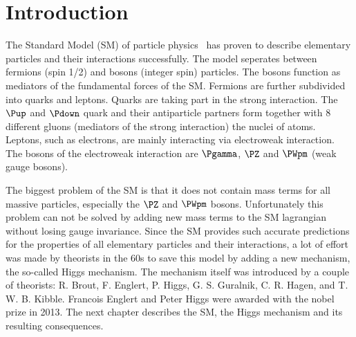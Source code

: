 \cleardoublepage
{}
{}
\let\oldchaptermarkformat=\chaptermarkformat
\renewcommand{\chaptermarkformat}{}
\let\chaptermarkformat=\oldchaptermarkformat
\chapter*{Introduction \label{chapter1_introduction}}

The Standard Model (SM) of particle physics~\cite{Glashow_EWK, Weinberg_EWK, Salam_EWK} has proven to describe elementary particles and their interactions successfully.
The model seperates between fermions (spin 1/2) and bosons (integer spin) particles. The bosons function as mediators of the
fundamental forces of the SM. Fermions are further subdivided into quarks and leptons. Quarks are taking part in the strong
interaction. The $\Pup$ and $\Pdown$ quark and their antiparticle partners form together with 8 different gluons (mediators
of the strong interaction) the nuclei of atoms. Leptons, such as electrons, are mainly interacting via electroweak interaction.
The bosons of the electroweak interaction are $\Pgamma$, $\PZ$ and $\PWpm$ (weak gauge bosons).

The biggest problem of the SM is that it does not contain mass terms for all massive particles, especially the $\PZ$ and $\PWpm$
bosons. Unfortunately this problem can not be solved by adding new mass terms to the SM lagrangian without losing
gauge invariance. Since the SM provides such accurate predictions for the properties of all elementary particles and their interactions,
a lot of effort was made by theorists in the 60s to save this model by adding a new mechanism, the so-called Higgs mechanism.
The mechanism itself was introduced by a couple of theorists: R. Brout, F. Englert, P. Higgs, G. S. Guralnik,
C. R. Hagen, and T. W. B. Kibble. Francois Englert and Peter Higgs were awarded with the nobel prize in 2013. The next chapter describes
the SM, the Higgs mechanism and its resulting consequences.
